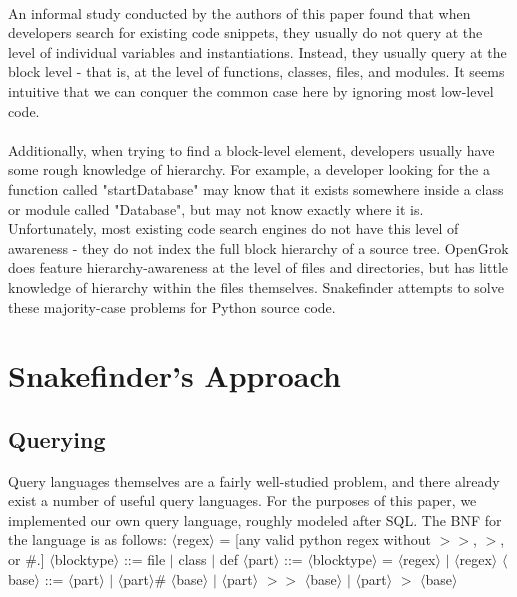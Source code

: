 \documentclass{article}
\begin{document}
\paragraph{}
An informal study conducted by the authors of this paper found that when developers search for existing code snippets, they usually do not query at the level of individual variables and instantiations. Instead, they usually query at the block level - that is, at the level of functions, classes, files, and modules. It seems intuitive that we can conquer the common case here by ignoring most low-level code.

\paragraph{}
Additionally, when trying to find a block-level element, developers usually have some rough knowledge of hierarchy. For example, a developer looking for the a function called "startDatabase" may know that it exists somewhere inside a class or module called "Database", but may not know exactly where it is. Unfortunately, most existing code search engines do not have this level of awareness - they do not index the full block hierarchy of a source tree. OpenGrok does feature hierarchy-awareness at the level of files and directories, but has little knowledge of hierarchy within the files themselves. Snakefinder attempts to solve these majority-case problems for Python source code.

\section{Snakefinder's Approach}
\subsection{Querying}
Query languages themselves are a fairly well-studied problem, and there already exist a number of useful query languages. For the purposes of this paper, we implemented our own query language, roughly modeled after SQL. The BNF for the language is as follows:\newline
\newline
$\langle$regex$\rangle$ = [any valid python regex without $>>$, $>$, or \#.]
\newline
$\langle$blocktype$\rangle$ ::= file $|$ class $|$ def
\newline
$\langle$part$\rangle$ ::= $\langle$blocktype$\rangle$ = $\langle$regex$\rangle$ $|$ $\langle$regex$\rangle$
\newline
$\langle$base$\rangle$ ::= $\langle$part$\rangle$ $|$ $\langle$part$\rangle$\# $\langle$base$\rangle$ $|$ $\langle$part$\rangle$ $>>$ $\langle$base$\rangle$ $|$ $\langle$part$\rangle$ $>$ $\langle$base$\rangle$
\newline
\end{document}
